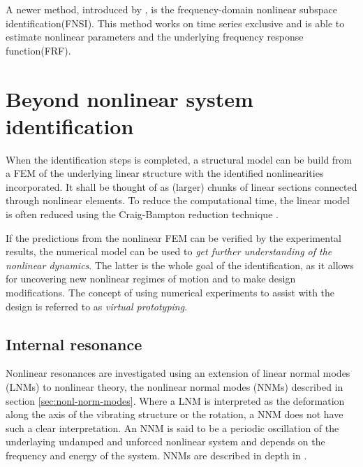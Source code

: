 A newer method, introduced by \autocite{noel2013a}, is the frequency-domain
nonlinear subspace identification(FNSI). This method works on
time series exclusive and is able to estimate nonlinear parameters and the
underlying frequency response function(FRF).






\section{Beyond nonlinear system identification}
\label{sec:beyond-nonl-syst}

When the identification steps is completed, a structural model can be build from
a FEM of the underlying linear structure with the identified nonlinearities
incorporated. It shall be thought of as (larger) chunks of linear sections
connected through nonlinear elements. To reduce the computational time, the
linear model is often reduced using the Craig-Bampton reduction technique
\autocite{craig1968a}.

If the predictions from the nonlinear FEM can be verified by the
experimental results, the numerical model can be used to \textit{get further
  understanding of the nonlinear dynamics}. The latter is the whole goal of the
identification, as it allows for uncovering new nonlinear regimes of motion and
to make design modifications. The concept of using numerical experiments to
assist with the design is referred to as \textit{virtual prototyping}.


\subsection{Internal resonance}
\label{sec:internal-resonance}


Nonlinear resonances are investigated using an extension of linear normal modes
(LNMs) to nonlinear theory, the nonlinear normal modes (NNMs) described in
section \ref{sec:nonl-norm-modes}.
Where a LNM is interpreted as the deformation along the axis of the vibrating
structure or the rotation, a NNM does not have such a clear interpretation.
An NNM is said to be a periodic oscillation of the underlaying undamped and
unforced nonlinear system and depends on the frequency and energy of the
system. NNMs are described in depth in \autocites{kerschen2009b, kerschen2009a}.


